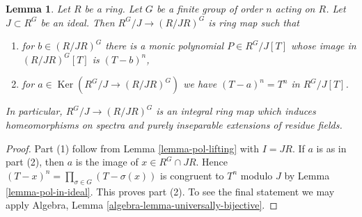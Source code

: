 \documentclass[10pt,a4paper]{amsart}
\theoremstyle{plain}
\newtheorem{lemma}[subsection]{Lemma}
\theoremstyle{definition}
\theoremstyle{remark}
\numberwithin{equation}{subsection}
\def\Ker{\mathop{\mathrm{Ker}}}
\begin{document}
\begin{lemma}
\label{lemma-invariants-modulo-bis}
Let $R$ be a ring. Let $G$ be a finite group of order $n$ acting on $R$.
Let $J \subset R^G$ be an ideal. Then $R^G/J \to (R/JR)^G$ is ring map
such that
\begin{enumerate}
\item for $b \in (R/JR)^G$ there is a monic polynomial
$P \in R^G/J[T]$ whose image in $(R/JR)^G[T]$ is $(T - b)^n$,
\item for $a \in \Ker(R^G/J \to (R/JR)^G)$
we have $(T - a)^n = T^n$ in $R^G/J[T]$.
\end{enumerate}
In particular, $R^G/J \to (R/JR)^G$ is an integral ring map which
induces homeomorphisms on spectra and purely inseparable extensions of
residue fields.
\end{lemma}

\begin{proof}
Part (1) follow from Lemma \ref{lemma-pol-lifting} with $I = JR$.
If $a$ is as in part (2), then $a$ is the image of $x \in R^G \cap JR$.
Hence $(T - x)^n = \prod_{\sigma \in G} (T - \sigma(x))$
is congruent to $T^n$ modulo $J$ by Lemma \ref{lemma-pol-in-ideal}.
This proves part (2). To see the final statement we may apply
Algebra, Lemma \ref{algebra-lemma-universally-bijective}.
\end{proof}
\end{document}
